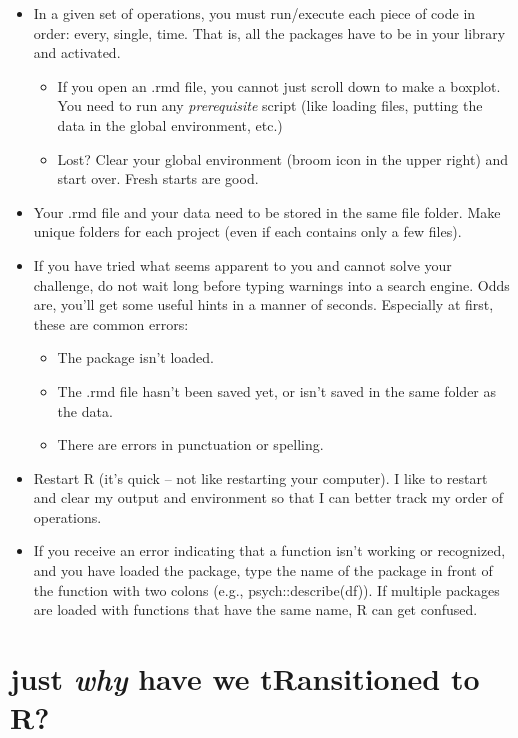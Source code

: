 \documentclass[
  11pt,
]{book}
\providecommand{\tightlist}{%
  \setlength{\itemsep}{0pt}\setlength{\parskip}{0pt}}
\begin{document}
\begin{itemize}
\tightlist
\item
  In a given set of operations, you must run/execute each piece of code in order: every, single, time. That is, all the packages have to be in your library and activated.

  \begin{itemize}
  \tightlist
  \item
    If you open an .rmd file, you cannot just scroll down to make a boxplot. You need to run any \emph{prerequisite} script (like loading files, putting the data in the global environment, etc.)
  \item
    Lost? Clear your global environment (broom icon in the upper right) and start over. Fresh starts are good.
  \end{itemize}
\item
  Your .rmd file and your data need to be stored in the same file folder. Make unique folders for each project (even if each contains only a few files).
\item
  If you have tried what seems apparent to you and cannot solve your challenge, do not wait long before typing warnings into a search engine. Odds are, you'll get some useful hints in a manner of seconds. Especially at first, these are common errors:

  \begin{itemize}
  \tightlist
  \item
    The package isn't loaded.
  \item
    The .rmd file hasn't been saved yet, or isn't saved in the same folder as the data.
  \item
    There are errors in punctuation or spelling.
  \end{itemize}
\item
  Restart R (it's quick -- not like restarting your computer). I like to restart and clear my output and environment so that I can better track my order of operations.
\item
  If you receive an error indicating that a function isn't working or recognized, and you have loaded the package, type the name of the package in front of the function with two colons (e.g., psych::describe(df)). If multiple packages are loaded with functions that have the same name, R can get confused.
\end{itemize}

\hypertarget{just-why-have-we-transitioned-to-r}{%
\section{\texorpdfstring{just \emph{why} have we tRansitioned to R?}{just why have we tRansitioned to R?}}\label{just-why-have-we-transitioned-to-r}}
\end{document}
